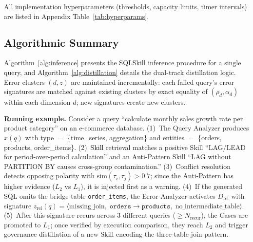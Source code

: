 All implementation hyperparameters (thresholds, capacity limits, timer intervals) are listed in Appendix Table~\ref{tab:hyperparams}.

\subsection{Algorithmic Summary}
\label{subsec:algorithms}

Algorithm~\ref{alg:inference} presents the SQLSkill inference procedure for a single query, and Algorithm~\ref{alg:distillation} details the dual-track distillation logic. Error clusters $(d, z)$ are maintained incrementally: each failed query's error signatures are matched against existing clusters by exact equality of $(\rho_d, \alpha_d)$ within each dimension $d$; new signatures create new clusters.

\textbf{Running example.} Consider a query ``calculate monthly sales growth rate per product category'' on an e-commerce database. (1)~The Query Analyzer produces $x(q)$ with type $=$ \{time\_series, aggregation\} and entities $=$ \{orders, products, order\_items\}. (2)~Skill retrieval matches a positive Skill ``LAG/LEAD for period-over-period calculation'' and an Anti-Pattern Skill ``LAG without PARTITION BY causes cross-group contamination.'' (3)~Conflict resolution detects opposing polarity with $\text{sim}(\tau_i, \tau_j) > 0.7$; since the Anti-Pattern has higher evidence ($L_2$ vs $L_1$), it is injected first as a warning. (4)~If the generated SQL omits the bridge table \texttt{order\_items}, the Error Analyzer activates $D_{\text{rel}}$ with signature $z_{\text{rel}}(q) = \langle \text{missing\_join},\; \texttt{orders}{\to}\texttt{products},\; \text{no\_intermediate\_table} \rangle$. (5)~After this signature recurs across 3 different queries ($\geq N_{\text{recur}}$), the Cases are promoted to $L_1$; once verified by execution comparison, they reach $L_2$ and trigger governance distillation of a new Skill encoding the three-table join pattern.


